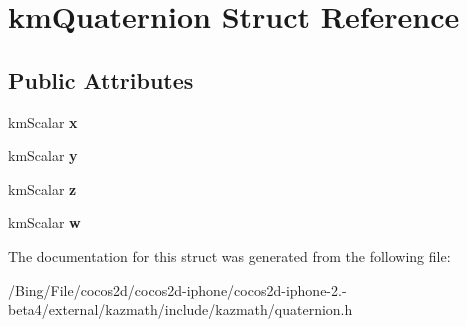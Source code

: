 \hypertarget{structkm_quaternion}{\section{km\-Quaternion Struct Reference}
\label{structkm_quaternion}
}
\subsection*{Public Attributes}
\begin{DoxyCompactItemize}
\item 
\hypertarget{structkm_quaternion_ae9cf860e36fa206f8c122f084ab7042d}{km\-Scalar {\bfseries x}}\label{structkm_quaternion_ae9cf860e36fa206f8c122f084ab7042d}

\item 
\hypertarget{structkm_quaternion_a6cb097db1a5e24c5e6d7a673dd9b5c68}{km\-Scalar {\bfseries y}}\label{structkm_quaternion_a6cb097db1a5e24c5e6d7a673dd9b5c68}

\item 
\hypertarget{structkm_quaternion_a63b2d2685be9e41190fdf45bf21e6690}{km\-Scalar {\bfseries z}}\label{structkm_quaternion_a63b2d2685be9e41190fdf45bf21e6690}

\item 
\hypertarget{structkm_quaternion_a3278d1a1de6f6d29ca9fa08bde51e726}{km\-Scalar {\bfseries w}}\label{structkm_quaternion_a3278d1a1de6f6d29ca9fa08bde51e726}

\end{DoxyCompactItemize}


The documentation for this struct was generated from the following file\-:\begin{DoxyCompactItemize}
\item 
/\-Bing/\-File/cocos2d/cocos2d-\/iphone/cocos2d-\/iphone-\/2.-\/beta4/external/kazmath/include/kazmath/quaternion.\-h\end{DoxyCompactItemize}
